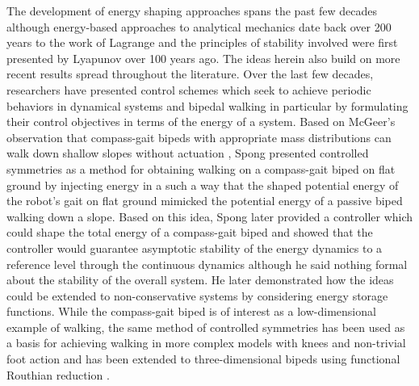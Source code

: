 \documentclass[english]{article}
\begin{document}
The development of energy shaping approaches spans the past few decades
although energy-based approaches to analytical mechanics date back over 200
years to the work of Lagrange
and the principles of stability involved were first presented by Lyapunov
over 100 years ago.
% 
The ideas herein also build on more recent results spread throughout the literature.
%
Over the last few decades, researchers have presented control schemes which seek
to achieve periodic behaviors in dynamical systems and bipedal walking in
particular by formulating their control objectives in terms of the energy of a
system.
%
Based on McGeer's observation that compass-gait bipeds with appropriate mass
distributions can walk down shallow slopes without actuation \cite{McGeer1990},
Spong presented controlled symmetries \cite{Spong2007} as a method for obtaining
walking on a compass-gait biped on flat ground by injecting energy in a such a
way that the shaped potential energy of the robot's gait on flat ground mimicked
the potential energy of a passive biped walking down a slope.
%
% 
Based on this idea, Spong later provided a controller which could shape the
total energy of a compass-gait biped and showed that the controller would
guarantee asymptotic stability of the energy dynamics to a reference level
through the continuous dynamics although he said nothing formal about the
stability of the overall system.
%
He later demonstrated how the ideas could be extended to non-conservative
systems \cite{Spong2007} by considering energy storage functions.
%
While the compass-gait biped is of interest as a low-dimensional example of
walking, the same method of controlled symmetries has been used as a basis for
achieving walking in more complex models with knees and non-trivial foot action
\cite{Sinnet2009} and has been extended to three-dimensional bipeds using
functional Routhian reduction \cite{Sinnet2009a}.
\end{document}
